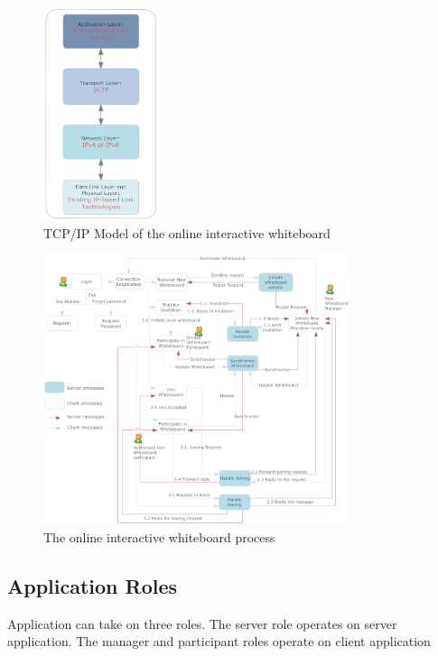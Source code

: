 \documentclass[conference]{IEEEtran}
\begin{document}
 \begin{figure}[h]
\begin{center}
\includegraphics[width=0.3\textwidth]{iw_tcpip.png}
\caption{TCP/IP Model of the online interactive whiteboard}
\label{fig:4}
\end{center}
\end{figure}
 \begin{figure}[t]
\begin{center}
\includegraphics[width=0.8\textwidth]{process}
\caption{The online interactive whiteboard process}
\label{fig:3}
\end{center}
\end{figure}
\subsection{Application Roles}
Application can take on three roles. The server role operates on server application. The manager and participant roles operate on client application
\end{document}
